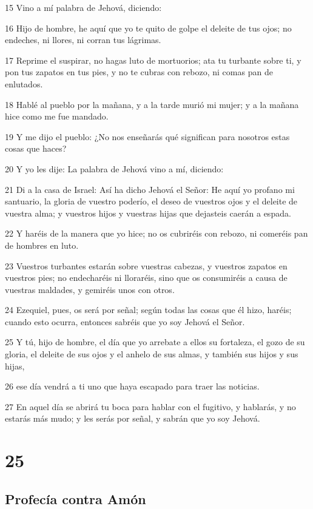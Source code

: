 \par 15 Vino a mí palabra de Jehová, diciendo:
\par 16 Hijo de hombre, he aquí que yo te quito de golpe el deleite de tus ojos; no endeches, ni llores, ni corran tus lágrimas.
\par 17 Reprime el suspirar, no hagas luto de mortuorios; ata tu turbante sobre ti, y pon tus zapatos en tus pies, y no te cubras con rebozo, ni comas pan de enlutados.
\par 18 Hablé al pueblo por la mañana, y a la tarde murió mi mujer; y a la mañana hice como me fue mandado.
\par 19 Y me dijo el pueblo: ¿No nos enseñarás qué significan para nosotros estas cosas que haces?
\par 20 Y yo les dije: La palabra de Jehová vino a mí, diciendo:
\par 21 Di a la casa de Israel: Así ha dicho Jehová el Señor: He aquí yo profano mi santuario, la gloria de vuestro poderío, el deseo de vuestros ojos y el deleite de vuestra alma; y vuestros hijos y vuestras hijas que dejasteis caerán a espada.
\par 22 Y haréis de la manera que yo hice; no os cubriréis con rebozo, ni comeréis pan de hombres en luto.
\par 23 Vuestros turbantes estarán sobre vuestras cabezas, y vuestros zapatos en vuestros pies; no endecharéis ni lloraréis, sino que os consumiréis a causa de vuestras maldades, y gemiréis unos con otros.
\par 24 Ezequiel, pues, os será por señal; según todas las cosas que él hizo, haréis; cuando esto ocurra, entonces sabréis que yo soy Jehová el Señor.
\par 25 Y tú, hijo de hombre, el día que yo arrebate a ellos su fortaleza, el gozo de su gloria, el deleite de sus ojos y el anhelo de sus almas, y también sus hijos y sus hijas,
\par 26 ese día vendrá a ti uno que haya escapado para traer las noticias.
\par 27 En aquel día se abrirá tu boca para hablar con el fugitivo, y hablarás, y no estarás más mudo; y les serás por señal, y sabrán que yo soy Jehová.

\chapter{25}

\section*{Profecía contra Amón}

